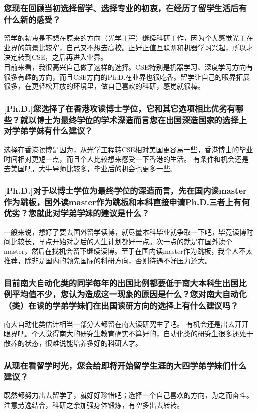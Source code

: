 \documentclass[a4paper,UTF8]{book}
\begin{document}
    
    \subsubsection*{您现在回顾当初选择留学、选择专业的初衷，在经历了留学生活后有什么新的感受？}
    留学的初衷是不想在原来的方向（光学工程）继续科研工作，因为个人感觉光工在业界的前景比较窄，自己又不想去高校。正好正值互联网和机器学习兴起，所以才决定转到CSE，之后再进入业界。\\
    目前来看，我很高兴自己做了这样的选择。CSE特别是机器学习、深度学习方向有很多有趣的方向，而且CSE方向的Ph.D.在业界也很吃香。留学让自己的眼界拓展很多，在更轻松开放的环境里，做自己喜欢的科研，感觉就很棒。

    \subsubsection*{[Ph.D.]您选择了在香港攻读博士学位，它和其它选项相比优劣有哪些？就以博士为最终学位的学术深造而言您在出国深造国家的选择上对学弟学妹有什么建议？}
    选择在香港读博是因为，从光学工程转CSE相对美国更容易一些，香港博士的毕业时间相对更短一点，而且个人比较想来感受一下香港的生活。
    有条件和机会还是去美国吧，大牛导师比较多，毕业后的机会也更多一些。

    \subsubsection*{[Ph.D.]对于以博士学位为最终学位的深造而言，先在国内读master作为跳板，国外读master作为跳板和本科直接申请Ph.D.三者上有何优劣？您就此对学弟学妹的建议是什么？}
    一般来说，想好了要去国外留学读博，就尽量本科毕业就争取一下吧，毕竟读博时间比较长，早点开始对之后的人生计划都好一点。次一点的就是在国外读个master，然后在找机会留下继续读博。至于在国内读master作为跳板，我个人不太推荐，除非是国内的领先国际的科研方向，否则待遇不好压力还大。

    \subsubsection*{目前南大自动化类的同学每年的出国比例都要低于南大本科生出国比例平均值不少，您认为造成这一现象的原因是什么？您对南大自动化（类）在读的学弟学妹们在出国读研方向的选择上有什么建议吗？}
    南大自动化类估计相当一部分人都留在南大读研究生了吧。
    有机会还是出去开开眼界吧。个人觉得南大的研究生教育确实不算好的，自动化类的研究生很多还处于散养的状态，很难说能培养多好的科研人才。

    \subsubsection*{从现在看留学时光，您会给即将开始留学生涯的大四学弟学妹们什么建议？}
    既然都努力出去留学了，就好好珍惜吧；选择一个自己喜欢的方向，为之而奋斗。注意劳逸结合，科研之余加强身体锻炼，有空多出去转转。
\end{document}
